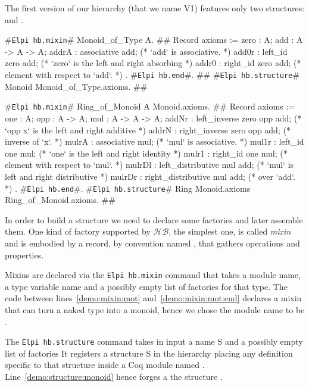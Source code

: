 \documentclass[a4paper,UKenglish,cleveref, autoref]{lipics-v2019}
\newcommand{\HB}{\ensuremath{\mathcal{HB}}}
\newcommand{\mixin}{mixin}
\newcommand{\Mixins}{Mixins}
\newcommand{\factory}{factory}
\newcommand{\factories}{factories}
\newcommand{\hbmixin}{{\tt\color{dkgreen}Elpi hb.mixin}}
\newcommand{\hbstructure}{{\tt\color{dkgreen}Elpi hb.structure}}
\newcommand{\hbend}{{\tt\color{dkgreen}Elpi hb.end}}
\theoremstyle{implem}
\theoremstyle{implem}
\theoremstyle{command}
\begin{document}
The first version of our hierarchy (that we name V1) features only two
structures:  and .
\begin{coqcode}
#\hbmixin{}# Monoid_of_Type A.                       #\label{demo:mixin:mot}#
  Record axioms := {
    zero : A;
    add : A -> A -> A;
    addrA : associative add;             (* `add` is associative.                   *)
    add0r : left_id zero add;            (* `zero` is the left and right absorbing  *)
    addr0 : right_id zero add;           (*   element with respect to `add`.        *)
  }.
#\hbend{}#.                                              #\label{demo:mixin:mot:end}#
#\hbstructure{}# Monoid Monoid_of_Type.axioms.        #\label{demo:structure:monoid}#

#\hbmixin{}# Ring_of_Monoid A Monoid.axioms.       #\label{demo:mixin:rom}#
  Record axioms := {
    one : A;
    opp : A -> A;
    mul : A -> A -> A;
    addNr : left_inverse zero opp add;   (* `opp x` is the left and right additive  *)
    addrN : right_inverse zero opp add;  (*   inverse of `x`.                       *)
    mulrA : associative mul;             (* `mul` is associative.                   *)
    mul1r : left_id one mul;             (* `one` is the left and right identity    *)
    mulr1 : right_id one mul;            (*   element with respect to `mul`.        *)
    mulrDl : left_distributive mul add;  (* `mul` is left and right distributive    *)
    mulrDr : right_distributive mul add; (*   over `add`.                           *)
  }.
#\hbend{}#.
#\hbstructure{}# Ring Monoid.axioms Ring_of_Monoid.axioms. #\label{demo:structure:ring}#

\end{coqcode}

In order to build a structure we need to declare some \factories{} and
later assemble them. One kind of \factory{} supported by \HB{}, the simplest
one, is called \emph{\mixin{}} and is embodied by a record, by convention named
, that gathers operations and properties.

\Mixins{} are declared via the \hbmixin{} command
that takes a module name,
a type variable name and a possibly empty list of \factories{} for that type.
The code between lines~\ref{demo:mixin:mot}
and~\ref{demo:mixin:mot:end} declares a \mixin{} that can turn a naked
type  into a monoid, hence we chose the module name to be .

The \hbstructure{} command takes in input a name S and a possibly
empty list of \factories{}
It registers a structure S in the hierarchy placing
any definition specific to that structure inside a Coq module named .
Line~\ref{demo:structure:monoid} hence forges a the structure .
\end{document}
